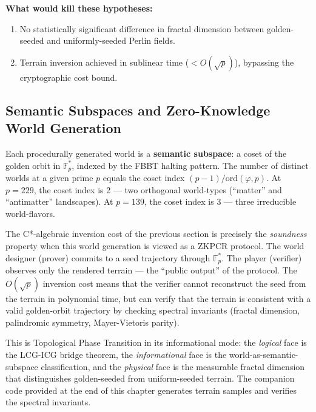 \textbf{What would kill these hypotheses:}
\begin{enumerate}[noitemsep]
  \item No statistically significant difference in fractal dimension between golden-seeded and uniformly-seeded Perlin fields.
  \item Terrain inversion achieved in sublinear time ($< O(\sqrt{p})$), bypassing the cryptographic cost bound.
\end{enumerate}

\subsection*{Semantic Subspaces and Zero-Knowledge World Generation}

Each procedurally generated world is a \textbf{semantic subspace}: a coset of the golden orbit in $\mathbb{F}_p^*$, indexed by the FBBT halting pattern. The number of distinct worlds at a given prime $p$ equals the coset index $(p-1)/\mathrm{ord}(\varphi, p)$. At $p = 229$, the coset index is 2 --- two orthogonal world-types (``matter'' and ``antimatter'' landscapes). At $p = 139$, the coset index is 3 --- three irreducible world-flavors.

The C*-algebraic inversion cost of the previous section is precisely the \emph{soundness} property when this world generation is viewed as a ZKPCR protocol. The world designer (prover) commits to a seed trajectory through $\mathbb{F}_p^*$. The player (verifier) observes only the rendered terrain --- the ``public output'' of the protocol. The $O(\sqrt{p})$ inversion cost means that the verifier cannot reconstruct the seed from the terrain in polynomial time, but can verify that the terrain is consistent with a valid golden-orbit trajectory by checking spectral invariants (fractal dimension, palindromic symmetry, Mayer-Vietoris parity).

This is Topological Phase Transition in its informational mode: the \emph{logical} face is the LCG-ICG bridge theorem, the \emph{informational} face is the world-as-semantic-subspace classification, and the \emph{physical} face is the measurable fractal dimension that distinguishes golden-seeded from uniform-seeded terrain. The companion code provided at the end of this chapter generates terrain samples and verifies the spectral invariants.



